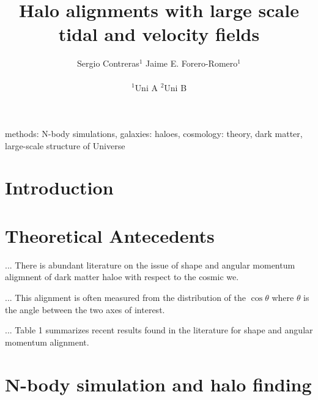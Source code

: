 \documentclass[usenatbib]{mn2e}
\begin{document}
\title[Vweb \& Tweb]{Halo alignments with large scale tidal and velocity fields}
\author[S. Contreras et al.]{
\parbox[t]{\textwidth}{\raggedright 
  Sergio Contreras$^{1}$ 
  Jaime E. Forero-Romero$^{1}$ 
}
\vspace*{6pt}\\
$^{1}$Uni A
$^{2}$Uni B
}
\maketitle

\begin{abstract}

\end{abstract}
\begin{keywords}
methods: N-body simulations, galaxies: haloes, cosmology: theory, dark matter, large-scale structure of Universe
\end{keywords}


\section{Introduction}
\label{sec:introduction}


\section{Theoretical Antecedents}
\label{sec:theory}

... There is abundant literature on the issue of shape and angular momentum
aligmnent of dark matter haloe with respect to the cosmic we.

... This alignment is often measured from the distribution of the
$\cos\theta$ where $\theta$ is the angle between the two axes of
interest.

... Table 1 summarizes recent results found in the literature for
shape and angular momentum alignment.


\citep{Libeskind2013} %
\citep{Codis2012}
\citep{Faltenbacher2009} %
\citep{Paz2008} %
\citep{Platen2008} %
\citep{AragonCalvo2007} %
\citep{Lee2007}%
\citep{Hahn2007}%
\citep{Lee2002}%
\citep{Hatton2001} %

\section{N-body simulation and halo finding}
\end{document}
